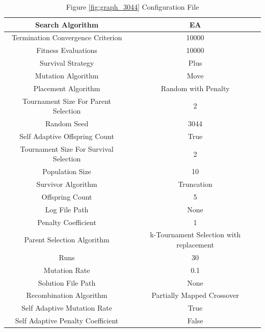 \documentclass{standalone}
\begin{document}
\begin{table}[!htb]
	\centering
	\caption{Figure \ref{fig:graph_3044} Configuration File}
	\label{tab:graph_3044}
	\begin{tabular}{| c | c |}
		\hline
		Search Algorithm		& EA		 \\
		\hline
		Termination Convergence Criterion		& 10000		 \\
		\hline
		Fitness Evaluations		& 10000		 \\
		\hline
		Survival Strategy		& Plus		 \\
		\hline
		Mutation Algorithm		& Move		 \\
		\hline
		Placement Algorithm		& Random with Penalty		 \\
		\hline
		Tournament Size For Parent Selection		& 2		 \\
		\hline
		Random Seed		& 3044		 \\
		\hline
		Self Adaptive Offspring Count		& True		 \\
		\hline
		Tournament Size For Survival Selection		& 2		 \\
		\hline
		Population Size		& 10		 \\
		\hline
		Survivor Algorithm		& Truncation		 \\
		\hline
		Offspring Count		& 5		 \\
		\hline
		Log File Path		& None		 \\
		\hline
		Penalty Coefficient		& 1		 \\
		\hline
		Parent Selection Algorithm		& k-Tournament Selection with replacement		 \\
		\hline
		Runs		& 30		 \\
		\hline
		Mutation Rate		& 0.1		 \\
		\hline
		Solution File Path		& None		 \\
		\hline
		Recombination Algorithm		& Partially Mapped Crossover		 \\
		\hline
		Self Adaptive Mutation Rate		& True		 \\
		\hline
		Self Adaptive Penalty Coefficient		& False		 \\
		\hline
	\end{tabular}
\end{table}
\end{document}
